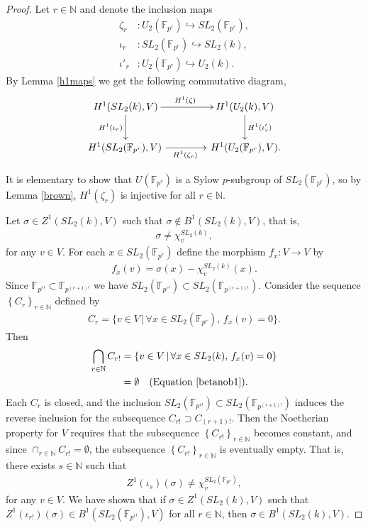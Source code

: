 \documentclass[12pt]{amsart}
\numberwithin{equation}{section}
\theoremstyle{definition}
\theoremstyle{remark}
\theoremstyle{remark}
\begin{document}
\begin{proof}
	Let $r \in \mathbb{N}$ and denote the inclusion maps
\begin{align*}
	\zeta_r&:U_2(\mathbb{F}_{p^r}) \hookrightarrow SL_2(\mathbb{F}_{p^r}), \\
	\iota_r&:SL_2(\mathbb{F}_{p^r}) \hookrightarrow SL_2(k), \\
	\iota'_r&:U_2(\mathbb{F}_{p^r}) \hookrightarrow U_2(k).
\end{align*}
By Lemma \ref{h1maps} %
we get the following commutative diagram,
\begin{align}\label{eqn:cd}
	\xymatrix@C=40pt{
		H^1(SL_2(k), V) \ar[r]^{H^1(\zeta)} \ar[d]_{H^1(\iota_r)} & H^1(U_2(k), V) \ar[d]^{H^1(\iota'_r)} \\
		H^1(SL_2(\mathbb{F}_{p^r}), V)\, \ar[r]_{H^1(\zeta_r)} &\, H^1(U_2(\mathbb{F}_{p^r}), V).
	}
\end{align}

It is elementary to show that $U(\mathbb{F}_{p^r})$ is a Sylow $p$-subgroup of $SL_2(\mathbb{F}_{p^r})$, so by Lemma \ref{brown}, $H^1(\zeta_r)$ is injective for all $r \in \mathbb{N}$.

Let $\sigma\in Z^1(SL_2(k), V)$ such that $\sigma \notin B^1(SL_2(k), V)$, that is,
\begin{align}\label{betanob1}
	\sigma \neq \chi^{SL_2(k)}_v,
\end{align}
for any $v \in V$. For each $x\in SL_2(\mathbb{F}_{p^r})$ define the morphism $f_x:V\rightarrow V$ by
	\begin{align*}
		f_x(v) = \sigma(x) - \chi^{SL_2(k)}_v(x).
	\end{align*}
Since $\mathbb{F}_{p^{r!}} \subset \mathbb{F}_{p^{(r+1)!}}$ we have $SL_2(\mathbb{F}_{p^{r!}}) \subset SL_2(\mathbb{F}_{p^{(r+1)!}})$.
Consider the sequence $\left\{C_{r}\right\}_{r \in \mathbb{N}}$ defined by
	\begin{align*}
		C_{r} = \{v \in V \,|\,\forall x\in SL_2(\mathbb{F}_{p^{r}}),\, f_x(v) = 0\}.
	\end{align*}
	Then
\begin{align*}
	\bigcap_{r\in \mathbb{N}}C_{r!} &= \{v \in V \,|\, \forall x \in SL_2(k),\, f_x(v) = 0\} \\
		&= \emptyset \quad(\textrm{Equation \ref{betanob1}}).
\end{align*}
	Each $C_{r}$ is closed, and the inclusion $SL_2(\mathbb{F}_{p^{r!}}) \subset SL_2(\mathbb{F}_{p^{(r+1)!}})$ induces the reverse inclusion for the subsequence $C_{r!} \supset C_{(r+1)!}$.
Then the Noetherian property for $V$ requires that the subsequence $\left\{C_{r!}\right\}_{r \in \mathbb{N}}$ becomes constant, and since $\cap_{r\in\mathbb{N}}C_{r!} = \emptyset$, the subsequence $\left\{C_{r!}\right\}_{r \in \mathbb{N}}$ is eventually empty.
That is, there exists $s\in\mathbb{N}$ such that
	\begin{align*}
		Z^1(\iota_s)(\sigma) \neq \chi_v^{SL_2(\mathbb{F}_{p^{s}})},
	\end{align*}
	for any $v \in V$. We have shown that if $\sigma \in Z^1(SL_2(k), V)$ such that $Z^1(\iota_{r!})(\sigma) \in B^1(SL_2(\mathbb{F}_{p^{r!}}), V)$ for all $r \in \mathbb{N}$, then $\sigma \in B^1(SL_2(k), V)$.


\end{proof}
\end{document}
